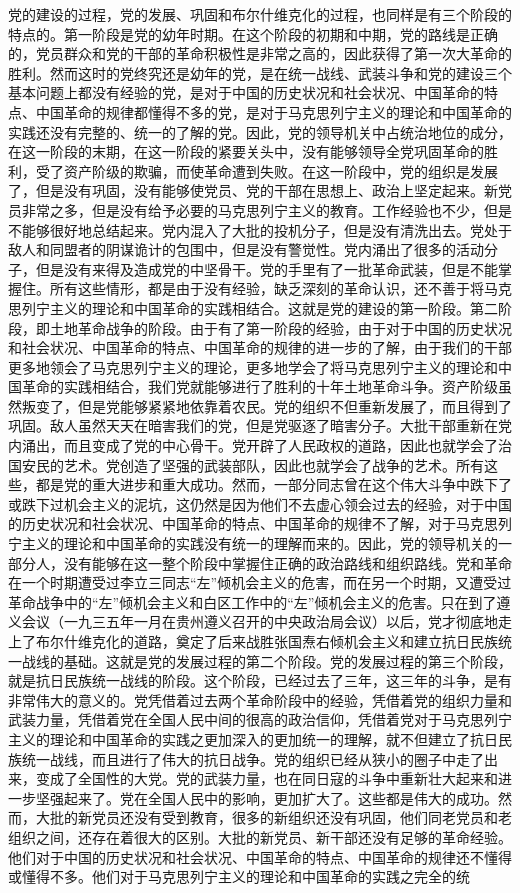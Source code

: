 党的建设的过程，党的发展、巩固和布尔什维克化的过程，也同样是有三个阶段的特点的。第一阶段是党的幼年时期。在这个阶段的初期和中期，党的路线是正确的，党员群众和党的干部的革命积极性是非常之高的，因此获得了第一次大革命的胜利。然而这时的党终究还是幼年的党，是在统一战线、武装斗争和党的建设三个基本问题上都没有经验的党，是对于中国的历史状况和社会状况、中国革命的特点、中国革命的规律都懂得不多的党，是对于马克思列宁主义的理论和中国革命的实践还没有完整的、统一的了解的党。因此，党的领导机关中占统治地位的成分，在这一阶段的末期，在这一阶段的紧要关头中，没有能够领导全党巩固革命的胜利，受了资产阶级的欺骗，而使革命遭到失败。在这一阶段中，党的组织是发展了，但是没有巩固，没有能够使党员、党的干部在思想上、政治上坚定起来。新党员非常之多，但是没有给予必要的马克思列宁主义的教育。工作经验也不少，但是不能够很好地总结起来。党内混入了大批的投机分子，但是没有清洗出去。党处于敌人和同盟者的阴谋诡计的包围中，但是没有警觉性。党内涌出了很多的活动分子，但是没有来得及造成党的中坚骨干。党的手里有了一批革命武装，但是不能掌握住。所有这些情形，都是由于没有经验，缺乏深刻的革命认识，还不善于将马克思列宁主义的理论和中国革命的实践相结合。这就是党的建设的第一阶段。第二阶段，即土地革命战争的阶段。由于有了第一阶段的经验，由于对于中国的历史状况和社会状况、中国革命的特点、中国革命的规律的进一步的了解，由于我们的干部更多地领会了马克思列宁主义的理论，更多地学会了将马克思列宁主义的理论和中国革命的实践相结合，我们党就能够进行了胜利的十年土地革命斗争。资产阶级虽然叛变了，但是党能够紧紧地依靠着农民。党的组织不但重新发展了，而且得到了巩固。敌人虽然天天在暗害我们的党，但是党驱逐了暗害分子。大批干部重新在党内涌出，而且变成了党的中心骨干。党开辟了人民政权的道路，因此也就学会了治国安民的艺术。党创造了坚强的武装部队，因此也就学会了战争的艺术。所有这些，都是党的重大进步和重大成功。然而，一部分同志曾在这个伟大斗争中跌下了或跌下过机会主义的泥坑，这仍然是因为他们不去虚心领会过去的经验，对于中国的历史状况和社会状况、中国革命的特点、中国革命的规律不了解，对于马克思列宁主义的理论和中国革命的实践没有统一的理解而来的。因此，党的领导机关的一部分人，没有能够在这一整个阶段中掌握住正确的政治路线和组织路线。党和革命在一个时期遭受过李立三同志“左”倾机会主义的危害，而在另一个时期，又遭受过革命战争中的“左”倾机会主义和白区工作中的“左”倾机会主义的危害。只在到了遵义会议（一九三五年一月在贵州遵义召开的中央政治局会议）以后，党才彻底地走上了布尔什维克化的道路，奠定了后来战胜张国焘右倾机会主义和建立抗日民族统一战线的基础。这就是党的发展过程的第二个阶段。党的发展过程的第三个阶段，就是抗日民族统一战线的阶段。这个阶段，已经过去了三年，这三年的斗争，是有非常伟大的意义的。党凭借着过去两个革命阶段中的经验，凭借着党的组织力量和武装力量，凭借着党在全国人民中间的很高的政治信仰，凭借着党对于马克思列宁主义的理论和中国革命的实践之更加深入的更加统一的理解，就不但建立了抗日民族统一战线，而且进行了伟大的抗日战争。党的组织已经从狭小的圈子中走了出来，变成了全国性的大党。党的武装力量，也在同日寇的斗争中重新壮大起来和进一步坚强起来了。党在全国人民中的影响，更加扩大了。这些都是伟大的成功。然而，大批的新党员还没有受到教育，很多的新组织还没有巩固，他们同老党员和老组织之间，还存在着很大的区别。大批的新党员、新干部还没有足够的革命经验。他们对于中国的历史状况和社会状况、中国革命的特点、中国革命的规律还不懂得或懂得不多。他们对于马克思列宁主义的理论和中国革命的实践之完全的统